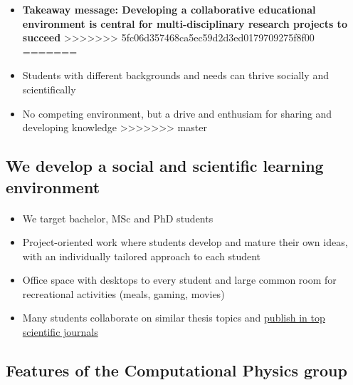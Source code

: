 \documentclass[%
<<<<<<< HEAD
<<<<<<< HEAD
oneside,                 %
final,                   %
=======
twoside,                 %
final,                   %
>>>>>>> 5fc06d357468ca5ec59d2d3ed0179709275f8f00
=======
oneside,                 %
final,                   %
>>>>>>> master
10pt]{article}
\begin{document}
\begin{itemize}
\begin{itemize}
\begin{itemize}
\end{itemize}

\noindent
\item \textbf{Takeaway message: Developing a collaborative educational environment is central for multi-disciplinary research projects to succeed}
>>>>>>> 5fc06d357468ca5ec59d2d3ed0179709275f8f00
=======
 \item Students with different backgrounds and needs can thrive socially and scientifically

 \item No competing environment, but a drive and enthusiam for sharing and developing knowledge
>>>>>>> master
\end{itemize}

\noindent





\subsection*{We develop a social and scientific learning environment}


\paragraph{}
\begin{itemize}
\item We target bachelor, MSc and PhD students

\item Project-oriented work where students develop and mature their own ideas, with an individually tailored approach to each student

\item Office space with desktops to every student and large common room for recreational activities (meals, gaming, movies)

\item Many students collaborate on similar  thesis topics and \href{{http://www.dn.no/talent/2014/06/12/Utdannelse/sommervikar-ble-toppforsker}}{publish in top scientific journals}
\end{itemize}

\noindent





\subsection*{Features of the Computational Physics group}


\end{itemize}
\end{document}
